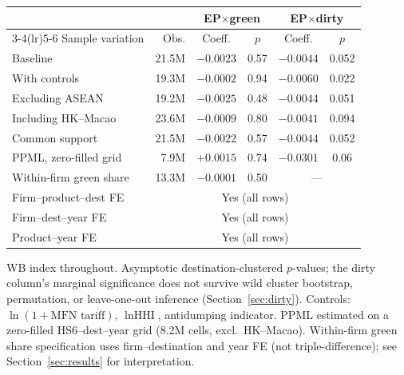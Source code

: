 \small
\begin{threeparttable}
\begin{tabular}{lrcccc}
\toprule
 & & \multicolumn{2}{c}{EP$\times$green} & \multicolumn{2}{c}{EP$\times$dirty} \\
\cmidrule(lr){3-4}\cmidrule(lr){5-6}
Sample variation & Obs. & Coeff. & $p$ & Coeff. & $p$ \\
\midrule
Baseline & 21.5M & $-0.0023$ & 0.57 & $-0.0044$ & 0.052 \\
With controls & 19.3M & $-0.0002$ & 0.94 & $-0.0060$ & 0.022 \\
Excluding ASEAN & 19.2M & $-0.0025$ & 0.48 & $-0.0044$ & 0.051 \\
Including HK--Macao & 23.6M & $-0.0009$ & 0.80 & $-0.0041$ & 0.094 \\
Common support & 21.5M & $-0.0022$ & 0.57 & $-0.0044$ & 0.052 \\
\midrule
PPML, zero-filled grid & 7.9M & $+0.0015$ & 0.74 & $-0.0301$ & 0.06 \\
Within-firm green share & 13.3M & $-0.0001$ & 0.50 & \multicolumn{2}{c}{---} \\
\midrule
Firm--product--dest FE & \multicolumn{5}{c}{Yes (all rows)} \\
Firm--dest--year FE & \multicolumn{5}{c}{Yes (all rows)} \\
Product--year FE & \multicolumn{5}{c}{Yes (all rows)} \\
\bottomrule
\end{tabular}
\begin{tablenotes}\footnotesize
\item WB index throughout. Asymptotic destination-clustered $p$-values; the dirty column's marginal significance does not survive wild cluster bootstrap, permutation, or leave-one-out inference (Section~\ref{sec:dirty}). Controls: $\ln(1+\text{MFN tariff})$, $\ln\text{HHI}$, antidumping indicator. PPML estimated on a zero-filled HS6--dest--year grid (8.2M cells, excl.\ HK--Macao). Within-firm green share specification uses firm--destination and year FE (not triple-difference); see Section~\ref{sec:results} for interpretation.
\end{tablenotes}
\end{threeparttable}
